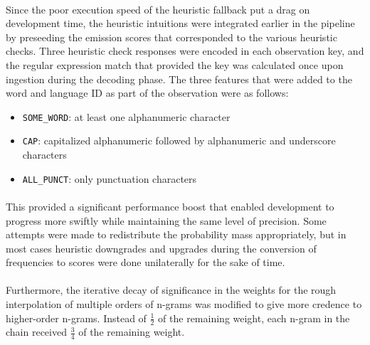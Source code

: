 \documentclass[11pt,a4paper]{article}
\begin{document}
\paragraph{}
Since the poor execution speed of the heuristic fallback put a drag on development time,
the heuristic intuitions were integrated earlier in the pipeline by preseeding the
emission scores that corresponded to the various heuristic checks. Three
heuristic check responses were encoded in each observation key, and the regular
expression match that provided the key was calculated once upon ingestion during
the decoding phase. The three features that were added to the word and language ID
as part of the observation were as follows:

\begin{itemize}
\item{\texttt{SOME\_WORD}: at least one alphanumeric character}
\item{\texttt{CAP}: capitalized alphanumeric followed by alphanumeric and underscore characters}
\item{\texttt{ALL\_PUNCT}: only punctuation characters }
\end{itemize}

\paragraph{}
This provided a significant performance boost that enabled development to progress
more swiftly while maintaining the same level of precision. Some attempts were made to
redistribute the probability mass appropriately, but in most cases heuristic downgrades
and upgrades during the conversion of frequencies to scores were done unilaterally
for the sake of time.

\paragraph{}
Furthermore, the iterative decay of significance in the weights for the rough
interpolation of multiple orders of n-grams was modified to give more credence
to higher-order n-grams. Instead of $\frac{1}{2}$ of the remaining weight, each n-gram
in the chain received $\frac{3}{4}$ of the remaining weight.
\end{document}
